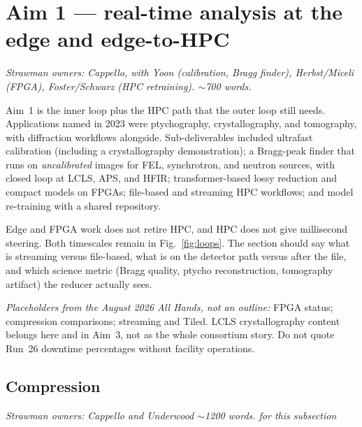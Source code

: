 
\section{Aim 1 --- real-time analysis at the edge and edge-to-HPC}
\label{sec:aim1}

\textit{Strawman owners: Cappello, with Yoon (calibration, Bragg finder),
Herbst/Miceli (FPGA), Foster/Schwarz (HPC retraining). $\sim$700 words.}

Aim~1 is the inner loop plus the HPC path that the outer loop still needs.
Applications named in 2023 were ptychography, crystallography, and tomography,
with diffraction workflows alongside. Sub-deliverables included ultrafast
calibration (including a crystallography demonstration); a Bragg-peak finder
that runs on \emph{uncalibrated} images for FEL, synchrotron, and neutron
sources, with closed loop at LCLS, APS, and HFIR; transformer-based lossy
reduction and compact models on FPGAs; file-based and streaming HPC workflows;
and model re-training with a shared repository.

Edge and FPGA work does not retire HPC, and HPC does not give millisecond
steering. Both timescales remain in Fig.~\ref{fig:loops}. The section should
say what is streaming versus file-based, what is on the detector path versus
after the file, and which science metric (Bragg quality, ptycho reconstruction,
tomography artifact) the reducer actually sees.

\textit{Placeholders from the August 2026 All Hands, not an outline:} FPGA
status; compression comparisons; streaming and Tiled. LCLS crystallography
content belongs here and in Aim~3, not as the whole consortium story. Do not
quote Run~26 downtime percentages without facility operations.

\subsection{Compression}
\textit{Strawman owners: Cappello and Underwood $\sim$1200 words. for this subsection}

